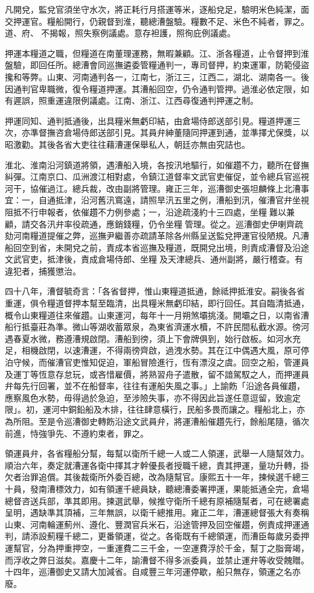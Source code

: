 \begin{pinyinscope}
凡開兌，監兌官須坐守水次，將正耗行月搭運等米，逐船兌足，驗明米色純潔，面交押運官。糧船開行，仍親督到淮，聽總漕盤驗。糧數不足、米色不純者，罪之。道、府、不揭報，照失察例議處。意存袒護，照徇庇例議處。

押運本糧道之職，但糧道在南董理運務，無暇兼顧。江、浙各糧道，止令督押到淮盤驗，即回任所。總漕會同巡撫遴委管糧通判一，專司督押，約束運軍，防範侵盜攙和等弊。山東、河南通判各一，江南七，浙江三，江西二，湖北、湖南各一。後因通判官卑職微，復令糧道押運。其漕船回空，仍令通判管押。過淮必依定限，如有遲誤，照重運違限例議處。江南、浙江、江西尋復通判押運之制。

押運同知、通判抵通後，出具糧米無虧印結，由倉場侍郎送部引見。糧道押運三次，亦準督撫咨倉場侍郎送部引見。其員弁紳董隨同押運到通，並準擇尤保獎，以昭激勸。其後各省大吏往往藉漕運保舉私人，朝廷亦無由究詰也。

淮北、淮南沿河鎮道將領，遇漕船入境，各按汛地驅行，如催趲不力，聽所在督撫糾彈。江南京口、瓜洲渡江相對處，令鎮江道督率文武官吏催促，並令總兵官巡視河干，協催過江。總兵裁，改由副將管理。雍正三年，巡漕御史張坦麟條上北漕事宜：一，自通抵津，沿河舊汛窵遠，請照旱汛五里之例，漕船到汛，催漕官弁坐視阻抵不行申報者，依催趲不力例參處；一，沿途疏淺約十三四處，坐糧難以兼顧，請交各汛弁率役疏通，應銷錢糧，仍令坐糧管理。從之。巡漕御史伊喇齊疏劾河南糧道提催之弊，巡撫尹繼善亦疏請革除各州縣呈送監兌押運官役陋規。凡漕船回空到省，未開兌之前，責成本省巡撫及糧道，既開兌出境，則責成漕督及沿途文武官吏，抵津後，責成倉場侍郎、坐糧及天津總兵、通州副將，嚴行稽查。有違犯者，捕獲懲治。

四十八年，漕督毓奇言：「各省督押，惟山東糧道抵通，餘祗押抵淮安。嗣後各省重運，俱令糧道督押本幫至臨清，出具糧米無虧印結，即行回任。其自臨清抵通，概令山東糧道往來催趲。山東運河，每年十一月朔煞壩挑淺。開壩之日，以南省漕船行抵臺莊為準。微山等湖收蓄眾泉，為東省濟運水櫝，不許民間私截水源。徬河遇春夏水微，務遵漕規啟閉。漕船到徬，須上下會牌俱到，始行啟板。如河水充足，相機啟閉，以速漕運，不得兩徬齊啟，過洩水勢。其在江中偶遇大風，原可停泊守候，而催漕官吏惟知促迫，軍船冒險進行，恆有漂沒之虞。回空之船，管運員及運丁等恆意存怠玩，或吝惜雇價，將熟習舟子遣散，留不諳駕馭之人，而押運員弁每先行回署，並不在船督率，往往有運船失風之事。」上諭飭「沿途各員催趲，應察風色水勢，毋得過於急迫，至涉險失事，亦不得因此旨遂任意逗留，致逾定限」。初，運河中銅鉛船及木排，往往肆意橫行，民船多畏而讓之。糧船北上，亦為所阻。至是令巡漕御史轉飭沿途文武員弁，將運漕船催趲先行，餘船尾隨，循次前進，恃強爭先、不遵約束者，罪之。

領運員弁，各省糧船分幫，每幫以衛所千總一人或二人領運，武舉一人隨幫效力。順治六年，奏定就漕運各衛中擇其才幹優長者授職千總，責其押運，量功升轉，掛欠者治罪追償。其後裁衛所外委百總，改為隨幫官。康熙五十一年，揀候選千總三十員，發南漕標效力，如有領運千總員缺，聽總漕委署押運，果能抵通全完，倉場總督咨送兵部，準其即用。揀選武舉，候推守衛所千總有原補隨幫者，可在總署處呈明，遇缺準其頂補，三年無誤，以衛千總推用。雍正二年，漕運總督張大有奏稱山東、河南輪運薊州、遵化、豐潤官兵米石，沿途管押及回空催趲，例責成押運通判，請添設薊糧千總二，更番領運，從之。各衛既有千總領運，而漕臣每歲另委押運幫官，分為押重押空，一重運費二三千金，一空運費浮於千金，幫丁之脂膏竭，而浮收之弊日滋矣。嘉慶十二年，諭漕督不得多派委員，並禁止運弁等收受餽贈。十四年，巡漕御史又請大加減省。自咸豐三年河運停歇，船只無存，領運之名亦廢。


\end{pinyinscope}
